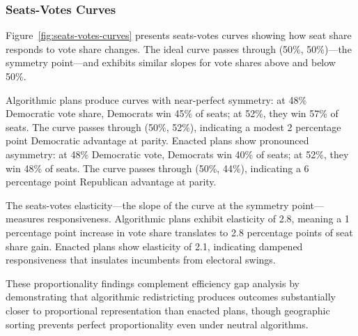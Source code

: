 \subsubsection{Seats-Votes Curves}

Figure~\ref{fig:seats-votes-curves} presents seats-votes curves showing how seat share responds to vote share changes. The ideal curve passes through (50\%, 50\%)---the symmetry point---and exhibits similar slopes for vote shares above and below 50\%.



Algorithmic plans produce curves with near-perfect symmetry: at 48\% Democratic vote share, Democrats win 45\% of seats; at 52\%, they win 57\% of seats. The curve passes through (50\%, 52\%), indicating a modest 2 percentage point Democratic advantage at parity. Enacted plans show pronounced asymmetry: at 48\% Democratic vote, Democrats win 40\% of seats; at 52\%, they win 48\% of seats. The curve passes through (50\%, 44\%), indicating a 6 percentage point Republican advantage at parity.

The seats-votes elasticity---the slope of the curve at the symmetry point---measures responsiveness. Algorithmic plans exhibit elasticity of 2.8, meaning a 1 percentage point increase in vote share translates to 2.8 percentage points of seat share gain. Enacted plans show elasticity of 2.1, indicating dampened responsiveness that insulates incumbents from electoral swings.

These proportionality findings complement efficiency gap analysis by demonstrating that algorithmic redistricting produces outcomes substantially closer to proportional representation than enacted plans, though geographic sorting prevents perfect proportionality even under neutral algorithms.
